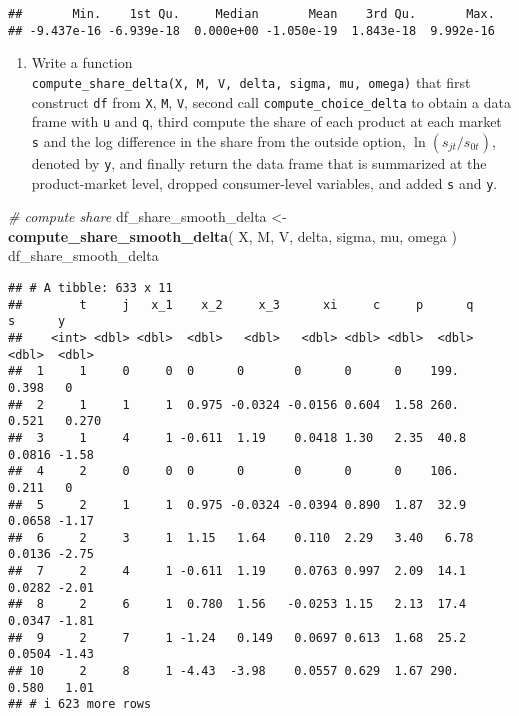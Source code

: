 \documentclass[
]{book}
\newenvironment{Shaded}{\begin{snugshade}}{\end{snugshade}}
\newcommand{\CommentTok}[1]{\textcolor[rgb]{0.56,0.35,0.01}{\textit{#1}}}
\newcommand{\FunctionTok}[1]{\textcolor[rgb]{0.13,0.29,0.53}{\textbf{#1}}}
\newcommand{\NormalTok}[1]{#1}
\newcommand{\OtherTok}[1]{\textcolor[rgb]{0.56,0.35,0.01}{#1}}
\providecommand{\tightlist}{%
  \setlength{\itemsep}{0pt}\setlength{\parskip}{0pt}}
\begin{document}
\begin{verbatim}
##       Min.    1st Qu.     Median       Mean    3rd Qu.       Max. 
## -9.437e-16 -6.939e-18  0.000e+00 -1.050e-19  1.843e-18  9.992e-16
\end{verbatim}

\begin{enumerate}
\def\labelenumi{\arabic{enumi}.}
\setcounter{enumi}{6}
\tightlist
\item
  Write a function \texttt{compute\_share\_delta(X,\ M,\ V,\ delta,\ sigma,\ mu,\ omega)} that first construct \texttt{df} from \texttt{X}, \texttt{M}, \texttt{V}, second call \texttt{compute\_choice\_delta} to obtain a data frame with \texttt{u} and \texttt{q}, third compute the share of each product at each market \texttt{s} and the log difference in the share from the outside option, \(\ln(s_{jt}/s_{0t})\), denoted by \texttt{y}, and finally return the data frame that is summarized at the product-market level, dropped consumer-level variables, and added \texttt{s} and \texttt{y}.
\end{enumerate}

\begin{Shaded}
\begin{Highlighting}[]
\CommentTok{\# compute share}
\NormalTok{df\_share\_smooth\_delta }\OtherTok{\textless{}{-}}
  \FunctionTok{compute\_share\_smooth\_delta}\NormalTok{(}
\NormalTok{    X, }
\NormalTok{    M, }
\NormalTok{    V, }
\NormalTok{    delta, }
\NormalTok{    sigma, }
\NormalTok{    mu, }
\NormalTok{    omega}
\NormalTok{    ) }
\NormalTok{df\_share\_smooth\_delta}
\end{Highlighting}
\end{Shaded}

\begin{verbatim}
## # A tibble: 633 x 11
##        t     j   x_1    x_2     x_3      xi     c     p      q      s      y
##    <int> <dbl> <dbl>  <dbl>   <dbl>   <dbl> <dbl> <dbl>  <dbl>  <dbl>  <dbl>
##  1     1     0     0  0      0       0      0      0    199.   0.398   0    
##  2     1     1     1  0.975 -0.0324 -0.0156 0.604  1.58 260.   0.521   0.270
##  3     1     4     1 -0.611  1.19    0.0418 1.30   2.35  40.8  0.0816 -1.58 
##  4     2     0     0  0      0       0      0      0    106.   0.211   0    
##  5     2     1     1  0.975 -0.0324 -0.0394 0.890  1.87  32.9  0.0658 -1.17 
##  6     2     3     1  1.15   1.64    0.110  2.29   3.40   6.78 0.0136 -2.75 
##  7     2     4     1 -0.611  1.19    0.0763 0.997  2.09  14.1  0.0282 -2.01 
##  8     2     6     1  0.780  1.56   -0.0253 1.15   2.13  17.4  0.0347 -1.81 
##  9     2     7     1 -1.24   0.149   0.0697 0.613  1.68  25.2  0.0504 -1.43 
## 10     2     8     1 -4.43  -3.98    0.0557 0.629  1.67 290.   0.580   1.01 
## # i 623 more rows
\end{verbatim}
\end{document}
